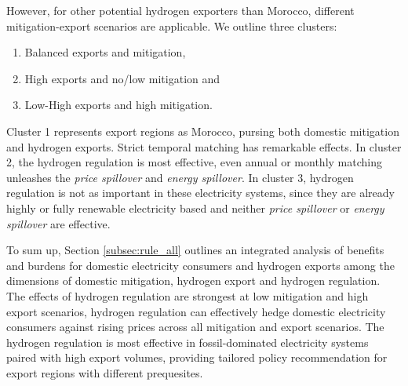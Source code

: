 However, for other potential hydrogen exporters than Morocco, different mitigation-export scenarios are applicable. We outline three clusters:
\begin{enumerate}
    \item Balanced exports and mitigation, 
    \item High exports and no/low mitigation and
    \item Low-High exports and high mitigation.
\end{enumerate} 
Cluster 1 represents export regions as Morocco, pursing both domestic mitigation and hydrogen exports. Strict temporal matching has remarkable effects. In cluster 2, the hydrogen regulation is most effective, even annual or monthly matching unleashes the \textit{price spillover} and \textit{energy spillover}. In cluster 3, hydrogen regulation is not as important in these electricity systems, since they are already highly or fully renewable electricity based and neither \textit{price spillover} or \textit{energy spillover} are effective.


To sum up, Section \ref{subsec:rule_all} outlines an integrated analysis of benefits and burdens for domestic electricity consumers and hydrogen exports among the dimensions of domestic mitigation, hydrogen export and hydrogen regulation. The effects of hydrogen regulation are strongest at low mitigation and high export scenarios, hydrogen regulation can effectively hedge domestic electricity consumers against rising prices across all mitigation and export scenarios. The hydrogen regulation is most effective in fossil-dominated electricity systems paired with high export volumes, providing tailored policy recommendation for export regions with different prequesites.








